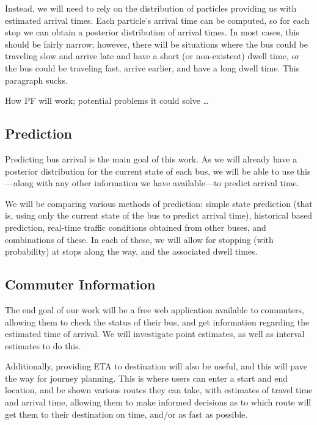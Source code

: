 \documentclass[12pt,a4paper]{article}
\begin{document}
Instead, we will need to rely on the distribution of particles providing us
with estimated arrival times.
Each particle's arrival time can be computed, so for each stop we can obtain 
a posterior distribution of arrival times.
In most cases, this should be fairly narrow;
however, there will be situations where the bus could be traveling slow and arrive
late and have a short (or non-existent) dwell time,
or the bus could be traveling fast, arrive earlier,
and have a long dwell time.
This paragraph sucks.


How PF will work; potential problems it could solve \ldots





\subsection{Prediction}
\label{sec:new-prediction}


Predicting bus arrival is the main goal of this work.
As we will already have a posterior distribution for the current state of
each bus, 
we will be able to use this---along with any other information we
have available---to predict arrival time.


We will be comparing various methods of prediction:
simple state prediction (that is, using only the current state of the 
bus to predict arrival time),
historical based prediction,
real-time traffic conditions obtained from other buses,
and combinations of these.
In each of these, we will allow for stopping (with probability) at stops
along the way, and the associated dwell times.




\subsection{Commuter Information}
\label{sec:commuter-info}


The end goal of our work will be a free web application available to
commuters, allowing them to check the status of their bus,
and get information regarding the estimated time of arrival.
We will investigate point estimates, as well as interval estimates to do this.


Additionally, providing ETA to destination will also be useful,
and this will pave the way for journey planning.
This is where users can enter a start and end location,
and be shown various routes they can take,
with estimates of travel time and arrival time,
allowing them to make informed decisions as to which route will get them
to their destination on time, and/or as fast as possible.
\end{document}

